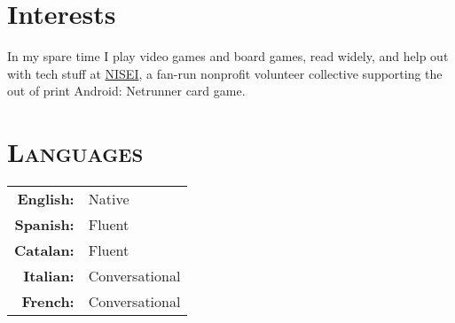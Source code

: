 \documentclass[a4paper,10pt]{article} %
\begin{document}
\section{Interests}
\raggedright
In my spare time I play video games and board games, read widely, and help out
with tech stuff at \href{https://nisei.net}{NISEI}, a fan-run nonprofit
volunteer collective supporting the out of print Android: Netrunner card game.

%
%
\section{\textsc{Languages}}
\begin{tabular}{rl}
 \textbf{English:} & Native \\
 \textbf{Spanish:} & Fluent \\
 \textbf{Catalan:} & Fluent \\
 \textbf{Italian:} & Conversational \\
 \textbf{French:}  & Conversational
\end{tabular}
\end{document}
